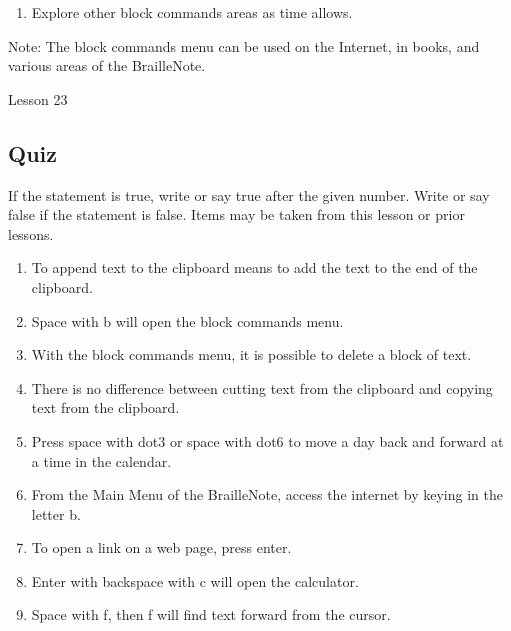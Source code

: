 \documentclass[10pt,letterpaper,twoside]{report}
\begin{document}
{{{{\begin{enumerate}
	\item Explore other block commands areas as time allows.
\end{enumerate}



Note: The block commands menu can be used on the Internet, in books, and various areas of the BrailleNote.





\clearpage

\newpage
Lesson 23

\subsection{Quiz}



If the statement is true, write or say true after the given number.  Write or say false if the statement is false.  Items may be taken from this lesson or prior lessons.



\begin{enumerate}
	\item To append text to the clipboard means to add the text to the end of the clipboard.
	      
	\item Space with b will open the block commands menu.
	      
	\item With the block commands menu, it is possible to delete a block of text.
	      
	\item There is no difference between cutting text from the clipboard and copying text from the clipboard.
	      
	\item Press space with dot3 or space with dot6 to move a day back and forward at a time in the calendar.
	      
	\item From the Main Menu of the BrailleNote, access the internet by keying in the letter b.
	      
	\item To open a link on a web page, press enter.
	      
	\item Enter with backspace with c will open the calculator.
	      
	\item Space with f, then f will find text forward from the cursor.
	      

\end{enumerate}}}}}
\end{document}
